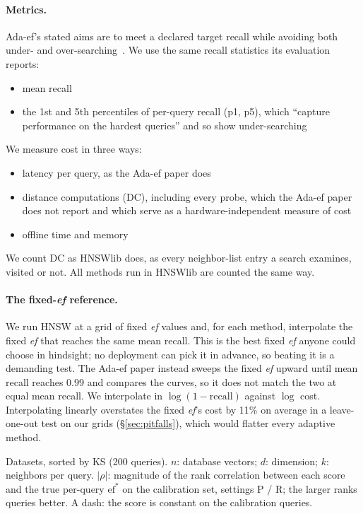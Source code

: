 \documentclass[twocolumn]{svjour3}
\newcommand{\ef}{\textit{ef}}
\begin{document}
\paragraph{Metrics.}
Ada-ef's stated aims are to meet a declared target recall while avoiding both under- and
over-searching~\cite{zhang2026adaef}. We use the same recall statistics its evaluation reports:
\begin{itemize}
\item mean recall
\item the 1st and 5th percentiles of per-query recall (p1, p5), which ``capture performance on the
  hardest queries'' and so show under-searching~\cite[\S 7.2]{zhang2026adaef}
\end{itemize}
We measure cost in three ways:
\begin{itemize}
\item latency per query, as the Ada-ef paper does
\item distance computations (DC), including every probe, which the Ada-ef paper does not report and
  which serve as a hardware-independent measure of cost
\item offline time and memory
\end{itemize}
We count DC as HNSWlib does, as every neighbor-list entry a search examines, visited or not. All
methods run in HNSWlib are counted the same way.

\paragraph{The fixed-\ef{} reference.}
We run HNSW at a grid of fixed \ef{} values and, for each method, interpolate the fixed \ef{} that
reaches the same mean recall. This is the best fixed \ef{} anyone could choose in hindsight; no
deployment can pick it in advance, so beating it is a demanding test. The Ada-ef paper instead sweeps
the fixed \ef{} upward until mean recall reaches 0.99 and compares the curves, so it does not match
the two at equal mean recall. We interpolate in $\log(1 - \text{recall})$ against $\log$ cost.
Interpolating linearly overstates the fixed \ef{}'s cost by 11\% on average in a leave-one-out test
on our grids (\S\ref{sec:pitfalls}), which would flatter every adaptive method.

\begin{table}[t]
  \caption{Datasets, sorted by KS (200 queries). $n$: database vectors; $d$: dimension; $k$: neighbors per query. $|\rho|$: magnitude of the rank correlation between each score and the true per-query $\mathrm{ef}^*$ on the calibration set, settings P / R; the larger ranks queries better. A dash: the score is constant on the calibration queries.}
  \label{tab:datasets}
  \centering\footnotesize
  \begin{adjustbox}{max width=\textwidth}\begin{adjustbox}{max width=\linewidth}\end{adjustbox}\end{adjustbox}
\end{table}
\end{document}
